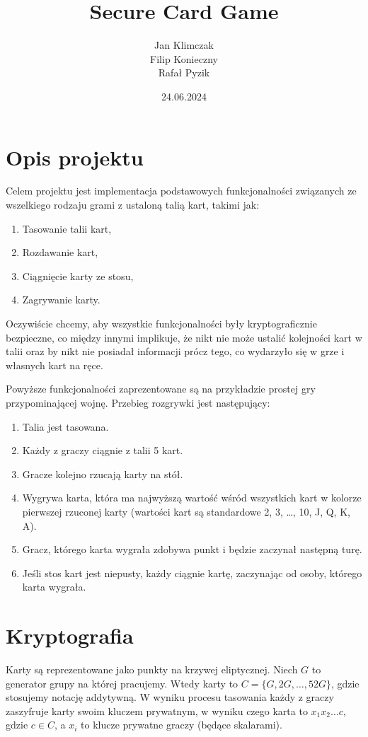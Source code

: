 \documentclass{article}
\title{Secure Card Game}
\author{Jan Klimczak \\ Filip Konieczny \\ Rafał Pyzik}
\date{24.06.2024}
\begin{document}
\maketitle

\section{Opis projektu}

Celem projektu jest implementacja podstawowych funkcjonalności związanych ze wszelkiego rodzaju grami z ustaloną talią kart, takimi jak:
\begin{enumerate}
    \item Tasowanie talii kart,
    \item Rozdawanie kart,
    \item Ciągnięcie karty ze stosu,
    \item Zagrywanie karty.
\end{enumerate}

Oczywiście chcemy, aby wszystkie funkcjonalności były kryptograficznie bezpieczne, co między innymi implikuje, że nikt nie może ustalić kolejności kart w talii oraz by nikt nie posiadał informacji prócz tego, co wydarzyło się w grze i własnych kart na ręce.  

Powyższe funkcjonalności zaprezentowane są na przykładzie prostej gry przypominającej wojnę. Przebieg rozgrywki jest następujący:

\begin{enumerate}
    \item Talia jest tasowana.
    \item Każdy z graczy ciągnie z talii 5 kart.
    \item Gracze kolejno rzucają karty na stół.
    \item Wygrywa karta, która ma najwyższą wartość wśród wszystkich kart w kolorze pierwszej rzuconej karty (wartości kart są standardowe 2, 3, \ldots, 10, J, Q, K, A).
    \item Gracz, którego karta wygrała zdobywa punkt i będzie zaczynał następną turę.
    \item Jeśli stos kart jest niepusty, każdy ciągnie kartę, zaczynając od osoby, którego karta wygrała.
\end{enumerate}


\section{Kryptografia}

Karty są reprezentowane jako punkty na krzywej eliptycznej. Niech $G$ to generator grupy na której pracujemy. Wtedy karty to $C = \{G,2G,\ldots,52G\}$, gdzie stosujemy notację addytywną. W wyniku procesu tasowania każdy z graczy zaszyfruje karty swoim kluczem prywatnym, w wyniku czego karta to $x_1x_2\ldots c$, gdzie $c \in C$, a $x_i$ to klucze prywatne graczy (będące skalarami).
\end{document}
